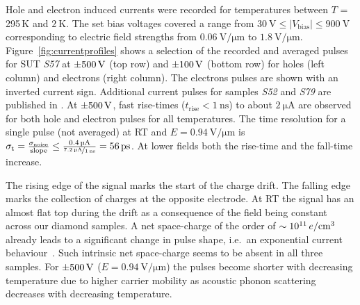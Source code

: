 Hole and electron induced currents were recorded for temperatures between $T$ = 295\,K and  $\SI{2}{\kelvin}$. 
The set bias voltages covered a range from $ \SI{30}{\volt} \leq |V_{\textrm{bias}}| \leq \SI{900}{\volt}$ corresponding to electric field strengths from $\SI{0.06}{\volt/\um}$ to $\SI{1.8}{\volt/\um}$. 
Figure~\ref{fig:currentprofiles} shows a selection of the recorded and averaged pulses for SUT \textit{S57} at $\SI{\pm 500}{\volt}$ (top row) and $\SI{\pm 100}{\volt}$ (bottom row) for holes (left column)
 and electrons (right column). 
The electrons pulses are shown with an inverted current sign. 
Additional current pulses for samples \textit{S52} and \textit{S79} are published in \cite{JansenThesis}. 
At $\SI{\pm 500}{\volt}$, fast rise-times ($t_{\textrm{rise}} < \SI{1}{\nano\second}$) to about $\SI{2}{\micro\ampere}$  are observed for both hole and electron pulses for all temperatures. 
The time resolution for a single pulse (not averaged) at RT and $E = \SI{0.94}{\volt/\micro\meter}$ is $\sigma_{\textrm{t}} = \frac{\sigma_{\textrm{noise}}}{\textrm{slope}}
\leq \frac{\SI{0.4}{\micro\ampere}}{\nicefrac{\SI{7.2}{\micro\ampere}}{\SI{1}{\nano\second}}} = \SI{56}{\pico\second}$. 
At lower fields both the rise-time and the fall-time increase.

The rising edge of the signal marks the start of the charge drift. 
The falling edge marks the collection of charges at the opposite electrode. 
At RT the signal has an almost flat top during the drift as a consequence of the field being constant across our diamond samples. 
A net space-charge of the order of $\sim \SI{e11}{\ensuremath{\mathnormal{e}}/\centi\meter^3}$ already leads to a significant change in pulse shape,
 i.e.~an exponential current behaviour~\cite{pernegger:073704}. 
Such intrinsic net space-charge seems to be absent in all three samples. 
For $\SI{\pm500}{\volt}$ ($E = \SI{0.94}{\volt/\micro\meter}$) the pulses become shorter with decreasing temperature
 due to higher carrier mobility as acoustic phonon scattering decreases with decreasing temperature.


